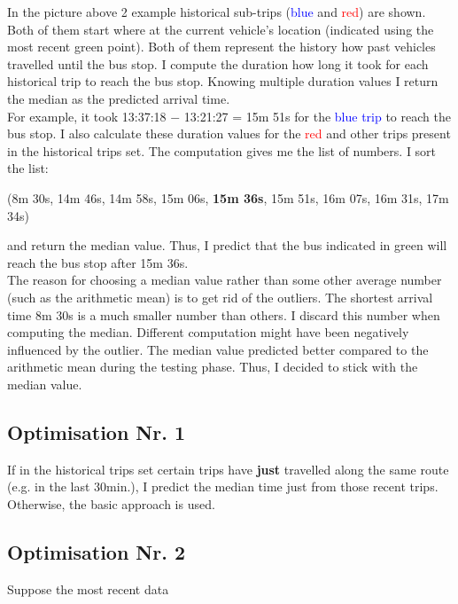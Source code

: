 \documentclass[12pt,a4paper,oneside,openright]{report}
\begin{document}
In the picture above 2 example historical sub-trips (\textcolor{blue}{blue}
and \textcolor{red}{red}) are shown.
Both of them start where at the current vehicle's location (indicated
using the most recent green point). Both of them represent the history how past
vehicles travelled until the bus stop. I compute the duration how long it
took for each historical trip to reach the bus stop. Knowing multiple duration values
I return the median as the predicted arrival time. \\

For example, it took 13:37:18 $-$ 13:21:27 = 15m 51s for the
\textcolor{blue}{blue trip} to reach the bus stop. I also calculate these
duration values for the \textcolor{red}{red} and other trips present in the
historical trips set. The computation gives me the list of numbers.
I sort the list:

\:
\:

(8m 30s, 14m 46s, 14m 58s, 15m 06s, \textbf{15m 36s}, 15m 51s, 16m 07s, 16m 31s,
 17m 34s)

\:
\:

and return the median value. Thus, I predict that the bus indicated in green will
reach the bus stop after 15m 36s. \\

The reason for choosing a median value rather than some other average number
(such as the arithmetic mean) is to get rid of the outliers. The shortest arrival time
8m 30s is a much smaller number than others. I discard this number when computing
the median. Different computation might have been negatively influenced by the outlier.
The median value predicted better compared to the arithmetic mean during the testing
phase. Thus, I decided to stick with the median value.

\subsection{Optimisation Nr. 1}

If in the historical trips set certain trips have \textbf{just} travelled along
the same route (e.g. in the last $30$min.), I predict the median time just from
those recent trips. Otherwise, the basic approach is used.

\subsection{Optimisation Nr. 2}

Suppose the most recent data
\end{document}
